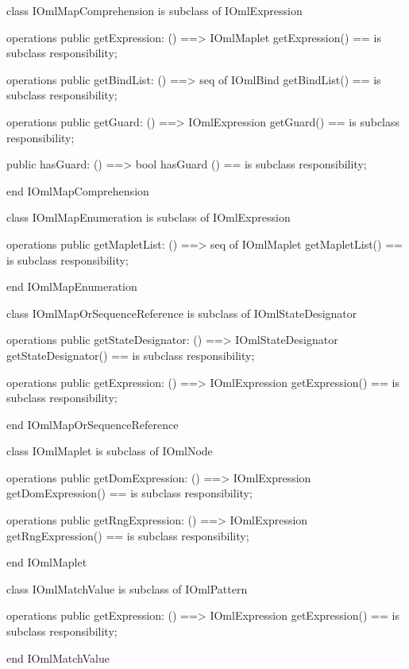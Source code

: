 \begin{vdm_al}
class IOmlMapComprehension
 is subclass of IOmlExpression

operations
  public getExpression: () ==> IOmlMaplet
  getExpression() == is subclass responsibility;

operations
  public getBindList: () ==> seq of IOmlBind
  getBindList() == is subclass responsibility;

operations
  public getGuard: () ==> IOmlExpression
  getGuard() == is subclass responsibility;

  public hasGuard: () ==> bool
  hasGuard () == is subclass responsibility;

end IOmlMapComprehension
\end{vdm_al}

\begin{vdm_al}
class IOmlMapEnumeration
 is subclass of IOmlExpression

operations
  public getMapletList: () ==> seq of IOmlMaplet
  getMapletList() == is subclass responsibility;

end IOmlMapEnumeration
\end{vdm_al}

\begin{vdm_al}
class IOmlMapOrSequenceReference
 is subclass of IOmlStateDesignator

operations
  public getStateDesignator: () ==> IOmlStateDesignator
  getStateDesignator() == is subclass responsibility;

operations
  public getExpression: () ==> IOmlExpression
  getExpression() == is subclass responsibility;

end IOmlMapOrSequenceReference
\end{vdm_al}

\begin{vdm_al}
class IOmlMaplet
 is subclass of IOmlNode

operations
  public getDomExpression: () ==> IOmlExpression
  getDomExpression() == is subclass responsibility;

operations
  public getRngExpression: () ==> IOmlExpression
  getRngExpression() == is subclass responsibility;

end IOmlMaplet
\end{vdm_al}

\begin{vdm_al}
class IOmlMatchValue
 is subclass of IOmlPattern

operations
  public getExpression: () ==> IOmlExpression
  getExpression() == is subclass responsibility;

end IOmlMatchValue
\end{vdm_al}


